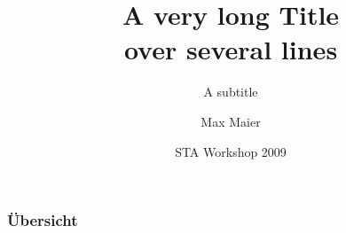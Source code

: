 \documentclass[10pt,a4paper]{beamer}
\title[Short version]{A very long Title \\ over several lines}
\subtitle[short version]{A subtitle}
\date[2009]{STA Workshop 2009}
\author[M. Maier]{Max Maier}
\institute[Uni Leipzig]{Universit¨at Leipzig}
\begin{document}
\begin{frame}
  \titlepage
\end{frame}
\begin{frame}
  \frametitle{Übersicht}
  \tableofcontents
\end{frame}
\end{document}
